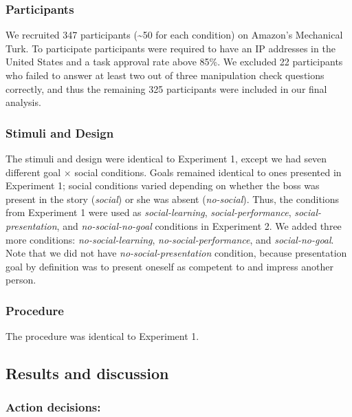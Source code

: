 \documentclass[10pt, letterpaper]{article}
\begin{document}
\subsubsection{Participants}\label{participants-1}

We recruited 347 participants (\textasciitilde{}50 for each condition)
on Amazon's Mechanical Turk. To participate participants were required
to have an IP addresses in the United States and a task approval rate
above 85\%. We excluded 22 participants who failed to answer at least
two out of three manipulation check questions correctly, and thus the
remaining 325 participants were included in our final analysis.

\subsubsection{Stimuli and Design}\label{stimuli-and-design-1}

The stimuli and design were identical to Experiment 1, except we had
seven different goal \(\times\) social conditions. Goals remained
identical to ones presented in Experiment 1; social conditions varied
depending on whether the boss was present in the story (\emph{social})
or she was absent (\emph{no-social}). Thus, the conditions from
Experiment 1 were used as \emph{social-learning},
\emph{social-performance}, \emph{social-presentation}, and
\emph{no-social-no-goal} conditions in Experiment 2. We added three more
conditions: \emph{no-social-learning}, \emph{no-social-performance}, and
\emph{social-no-goal}. Note that we did not have
\emph{no-social-presentation} condition, because presentation goal by
definition was to present oneself as competent to and impress another
person.

\subsubsection{Procedure}\label{procedure-1}

The procedure was identical to Experiment 1.

\subsection{Results and discussion}\label{results-and-discussion-1}

\subsubsection{Action decisions:}\label{action-decisions-1}
\end{document}
